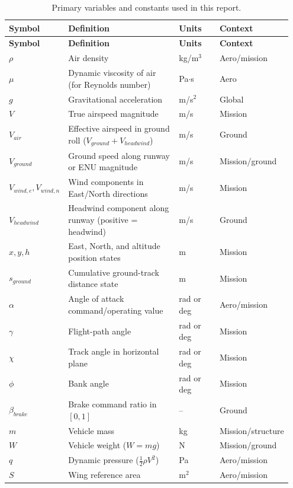 \begin{longtable}{p{0.15\linewidth} p{0.50\linewidth} p{0.18\linewidth} p{0.12\linewidth}}
\caption{Primary variables and constants used in this report.}\label{tab:nomenclature}\\
\toprule
\textbf{Symbol} & \textbf{Definition} & \textbf{Units} & \textbf{Context} \\
\midrule
\endfirsthead
\toprule
\textbf{Symbol} & \textbf{Definition} & \textbf{Units} & \textbf{Context} \\
\midrule
\endhead
\(\rho\) & Air density & kg/m\(^3\) & Aero/mission \\
\(\mu\) & Dynamic viscosity of air (for Reynolds number) & Pa\(\cdot\)s & Aero \\
\(g\) & Gravitational acceleration & m/s\(^2\) & Global \\
\(V\) & True airspeed magnitude & m/s & Mission \\
\(V_{air}\) & Effective airspeed in ground roll (\(V_{ground}+V_{headwind}\)) & m/s & Ground \\
\(V_{ground}\) & Ground speed along runway or ENU magnitude & m/s & Mission/ground \\
\(V_{wind,e}, V_{wind,n}\) & Wind components in East/North directions & m/s & Mission \\
\(V_{headwind}\) & Headwind component along runway (positive = headwind) & m/s & Ground \\
\(x,y,h\) & East, North, and altitude position states & m & Mission \\
\(s_{ground}\) & Cumulative ground-track distance state & m & Mission \\
\(\alpha\) & Angle of attack command/operating value & rad or deg & Aero/mission \\
\(\gamma\) & Flight-path angle & rad or deg & Mission \\
\(\chi\) & Track angle in horizontal plane & rad or deg & Mission \\
\(\phi\) & Bank angle & rad or deg & Mission \\
\(\beta_{brake}\) & Brake command ratio in \([0,1]\) & -- & Ground \\
\(m\) & Vehicle mass & kg & Mission/structure \\
\(W\) & Vehicle weight (\(W=mg\)) & N & Mission/ground \\
\(q\) & Dynamic pressure (\(\tfrac12 \rho V^2\)) & Pa & Aero/mission \\
\(S\) & Wing reference area & m\(^2\) & Aero/mission \\

\end{longtable}
